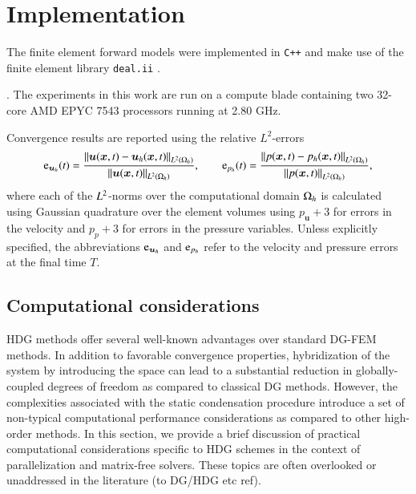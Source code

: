 

\section{Implementation}%
\label{sec:implementation_details}

The finite element forward models were implemented in \texttt{C++} and make use of the finite element library \texttt{deal.ii} \cite{dealII93}.

. 
The experiments in this work are run on a compute blade containing two 32-core AMD EPYC 7543 processors running at 2.80 GHz.

Convergence results are reported using the relative $L^2$-errors 
\begin{equation}
  \text{e}_{\bm{u}_h}(t) = \frac{ \left\lVert \bm{u}(\bm{x}, t) - \bm{u}_h(\bm{x}, t)\right\rVert_{L^2(\Omega_h)} }{ \left\lVert \bm{u}(\bm{x}, t) \right\rVert_{L^2(\Omega_h)} }, \qquad 
  \text{e}_{p_h}(t) =\frac{ \left\lVert p(\bm{x}, t) - p_h(\bm{x}, t)\right\rVert_{L^2(\Omega_h)} }{ \left\lVert p(\bm{x}, t) \right\rVert_{L^2(\Omega_h)} },
\end{equation}
where each of the $L^2$-norms over the computational domain $\Omega_h$ is calculated using Gaussian quadrature over the element volumes using $p_{\bm{u}} + 3$ for errors in the velocity and $p_{p} + 3$ for errors in the pressure variables.
Unless explicitly specified, the abbreviations $\text{e}_{\bm{u}_h}$ and $\text{e}_{p_h}$ refer to the velocity and pressure errors at the final time $T$.



\subsection{Computational considerations}
\label{sec:computational}

HDG methods offer several well-known advantages over standard DG-FEM methods. 
In addition to favorable convergence properties, hybridization of the system by introducing the space  can lead to a substantial reduction in globally-coupled degrees of freedom as compared to classical DG methods.
However, the complexities associated with the static condensation procedure introduce a set of non-typical computational performance considerations as compared to other high-order methods.
In this section, we provide a brief discussion of practical computational considerations specific to HDG schemes in the context of parallelization and matrix-free solvers. These topics are often overlooked or unaddressed in the literature (to DG/HDG etc ref).

